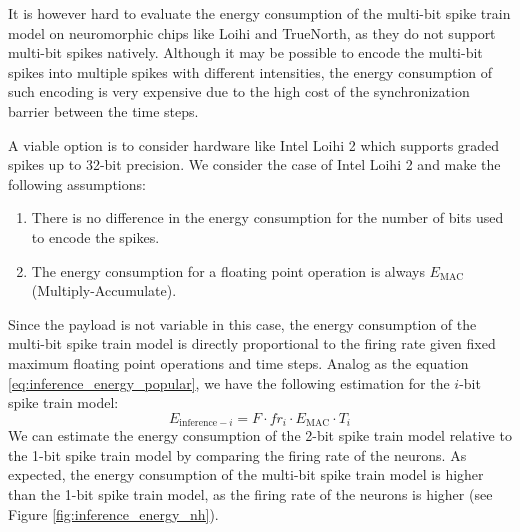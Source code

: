         It is however hard to evaluate the energy consumption of the multi-bit spike train model on neuromorphic chips like Loihi and TrueNorth, as they do not support multi-bit spikes natively. Although it may be possible to encode the multi-bit spikes into multiple spikes with different intensities, the energy consumption of such encoding is very expensive due to the high cost of the synchronization barrier between the time steps. 

        A viable option is to consider hardware like Intel Loihi 2 which supports graded spikes up to 32-bit precision. We consider the case of Intel Loihi 2 and make the following assumptions: 
        \begin{enumerate}
            \item There is no difference in the energy consumption for the number of bits used to encode the spikes.
            \item The energy consumption for a floating point operation is always $E_{\text{MAC}}$ (Multiply-Accumulate).
        \end{enumerate}
        Since the payload is not variable in this case, the energy consumption of the multi-bit spike train model is directly proportional to the firing rate given fixed maximum floating point operations and time steps. Analog as the equation \ref{eq:inference_energy_popular}, we have the following estimation for the $i$-bit spike train model:
        \begin{equation}
            E_{\text{inference}-i} = F \cdot fr_i \cdot E_{\text{MAC}} \cdot T_i
        \end{equation}
        We can estimate the energy consumption of the 2-bit spike train model relative to the 1-bit spike train model by comparing the firing rate of the neurons. As expected, the energy consumption of the multi-bit spike train model is higher than the 1-bit spike train model, as the firing rate of the neurons is higher (see Figure \ref{fig:inference_energy_nh}).
